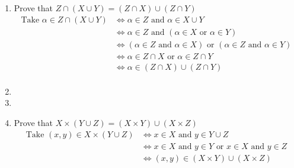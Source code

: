 \begin{enumerate}
    \item Prove that $Z \cap (X \cup Y) = (Z \cap X) \cup (Z \cap Y)$
        \begin{align*}
            \text{Take } \alpha \in Z \cap (X \cup Y) &\Leftrightarrow \alpha \in Z \text{ and } \alpha \in X \cup Y\\
            &\Leftrightarrow \alpha \in Z \text{ and } (\alpha \in X \text{ or } \alpha \in Y)\\
            &\Leftrightarrow (\alpha \in Z \text{ and } \alpha \in X) \text{ or } (\alpha \in Z \text{ and } \alpha \in Y)\\
            &\Leftrightarrow \alpha \in Z \cap X \text{ or } \alpha \in Z \cap Y\\
            &\Leftrightarrow \alpha \in (Z \cap X) \cup (Z \cap Y)\\
        \end{align*}

    \item

    \item

    \item Prove that $X\times(Y \cup Z) = (X \times Y) \cup (X \times Z)$\\
        \begin{align*}
            \text{Take } (x,y) \in X \times (Y \cup Z) &\Leftrightarrow x \in X \text{ and } y \in Y \cup Z\\
            &\Leftrightarrow x \in X \text{ and } y \in Y \text{ or } x \in X \text{ and } y \in Z\\
            &\Leftrightarrow (x,y) \in  (X \times Y) \cup (X \times Z)
        \end{align*}

\end{enumerate}
